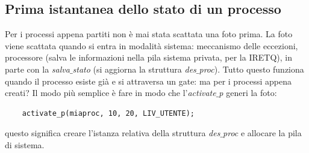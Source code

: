 \documentclass[11pt]{report}
\theoremstyle{definition}
\begin{document}
\subsection{Prima istantanea dello stato di un processo} Per i processi appena partiti non è mai stata scattata una foto prima. La foto viene scattata quando si entra in modalità sistema: meccanismo delle eccezioni, processore (salva le informazioni nella pila sistema privata, per la IRETQ), in parte con la \emph{salva$\_$stato} (si aggiorna la struttura \emph{des$\_$proc}). Tutto questo funziona quando il processo esiste già e si attraversa un gate: ma per i processi appena creati? Il modo più semplice è fare in modo che l'\emph{activate$\_$p} generi la foto: 
\begin{verbatim}
	activate_p(miaproc, 10, 20, LIV_UTENTE);
\end{verbatim}
questo significa creare l'istanza relativa della struttura \emph{des$\_$proc} e allocare la pila di sistema.
\end{document}
